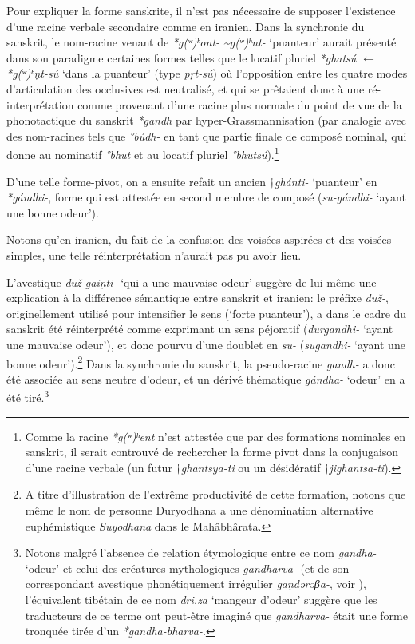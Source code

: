 \documentclass[11pt]{article}
\newcommand{\ipa}[1]{{\phon\textit{#1}}}
\begin{document}
Pour expliquer la forme sanskrite, il n'est pas nécessaire de supposer l'existence d'une racine verbale secondaire comme en iranien. Dans la synchronie du sanskrit, le nom-racine venant de \ipa{*g(ʷ)ʰont- \textasciitilde *g(ʷ)ʰnt-} `puanteur' aurait présenté dans son paradigme certaines formes telles que le locatif pluriel \ipa{*ghatsú} $\leftarrow$ \ipa{*g(ʷ)ʰṇt-sú} `dans la puanteur' (type \ipa{pṛt-sú}) où l'opposition entre les quatre modes d'articulation des occlusives est neutralisé, et qui se prêtaient donc à une ré-interprétation comme provenant d'une racine plus normale du point de vue de la phonotactique du sanskrit \ipa{*gandh} par hyper-Grassmannisation (par analogie avec des nom-racines tels que \ipa{°búdh-} en tant que partie finale de composé nominal, qui donne au nominatif \ipa{°bhut} et au locatif pluriel \ipa{°bhutsú}).\footnote{Comme la racine \ipa{*g(ʷ)ʰent} n'est attestée que par des formations nominales en sanskrit, il serait controuvé de rechercher la forme pivot dans la conjugaison d'une racine verbale (un futur $\dagger$\ipa{ghantsya-ti} ou un désidératif $\dagger$\ipa{jighantsa-ti}). }

D'une telle forme-pivot, on a ensuite refait un ancien $\dagger$\ipa{ghánti-} `puanteur' en \ipa{*gándhi-}, forme qui est attestée en second membre de composé (\ipa{su-gándhi-} `ayant une bonne odeur').

Notons qu'en iranien, du fait de la confusion des voisées aspirées et des voisées simples, une telle réinterprétation n'aurait pas pu avoir lieu.

L'avestique \ipa{duž-gaiṇti-} `qui a une mauvaise odeur' suggère de lui-même une explication à la différence sémantique entre sanskrit et iranien: le préfixe \ipa{duž-}, originellement utilisé pour intensifier le sens (`forte puanteur'), a dans le cadre du sanskrit été réinterprété comme exprimant un sens péjoratif (\ipa{durgandhi-} `ayant une mauvaise odeur'), et donc pourvu d'une doublet en \ipa{su-} (\ipa{sugandhi-} `ayant une bonne odeur').\footnote{A titre d'illustration de l'extrême productivité de cette formation, notons que même le nom de personne Duryodhana a  une dénomination alternative euphémistique \textit{Suyodhana} dans le Mahâbhârata.} Dans la synchronie du sanskrit, la pseudo-racine \ipa{gandh-} a donc été associée au sens neutre d'odeur, et un dérivé thématique \ipa{gándha-} `odeur' en a été tiré.\footnote{Notons malgré l'absence de relation étymologique entre ce nom \ipa{gandha-} `odeur' et celui des créatures mythologiques \ipa{gandharva-} (et de son correspondant avestique phonétiquement  irrégulier \ipa{gaṇdərəβa-}, voir \citealt{lubotsky2001indo}), l'équivalent tibétain de ce nom \ipa{dri.za} `mangeur d'odeur' suggère que les traducteurs de ce terme ont peut-être imaginé que \ipa{gandharva-} était une forme tronquée tirée d'un \ipa{*gandha-bharva-}.}
\end{document}
